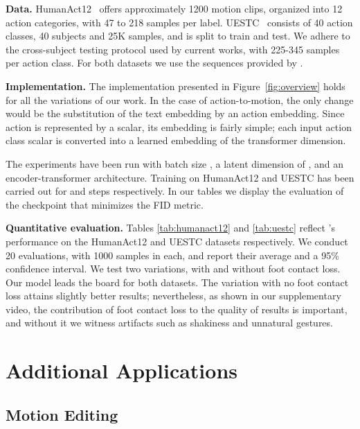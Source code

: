 \textbf{Data.}
HumanAct12~\citep{guo2020action2motion} offers approximately 1200 motion clips, organized into 12 action categories, with 47 to 218 samples per label. 
UESTC~\citep{ji2018large} consists of 40 action classes, 40 subjects and 25K samples, and is split to train and test. 
We adhere to the cross-subject testing protocol used by current works, with 225-345 samples per action class.
For both datasets we use the sequences provided by \citet{petrovich21actor}.

\textbf{Implementation.}
The implementation presented in Figure~\ref{fig:overview} holds for all the variations of our work. In the case of action-to-motion, the only change would be the substitution of the text embedding by an action embedding. Since action is represented by a scalar, its embedding is fairly simple; each input action class scalar is converted into a learned embedding of the transformer dimension.

The experiments have been run with batch size , a latent dimension of , and an encoder-transformer architecture. Training on HumanAct12 and UESTC has been carried out for  and  steps respectively. In our tables we display the evaluation of the checkpoint that minimizes the FID metric. 

\textbf{Quantitative evaluation.}
Tables \ref{tab:humanact12} and \ref{tab:uestc} reflect \ourmethod{}'s performance on the HumanAct12 and UESTC datasets respectively. We conduct 20 evaluations, with 1000 samples in each, and report their average and a 95\% confidence interval.
We test two variations, with and without foot contact loss.
Our model leads the board for both datasets. 
The variation with no foot contact loss attains slightly better results; nevertheless, as shown in our supplementary video, the contribution of foot contact loss to the quality of results is important, and without it we witness artifacts such as shakiness and unnatural gestures. 



\vspace{-5pt}
\section{Additional Applications}
\vspace{-5pt}
\subsection{Motion Editing} \label{sec:edit}
\vspace{-5pt}

